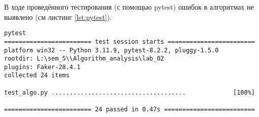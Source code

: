 В ходе проведённого тестирования (с помощью pytest) ошибок в алгоритмах не выявлено (см листинг \ref{lst:pytest}).

\vspace{0.25cm}
\begin{lstlisting}[caption=тестирование алгоритмов с помощью pytest]
pytest
======================== test session starts ========================
platform win32 -- Python 3.11.9, pytest-8.2.2, pluggy-1.5.0
rootdir: L:\sem_5\\Algorithm_analysis\lab_02
plugins: Faker-28.4.1
collected 24 items                                                                                                                                                                

test_algo.py .....................................             [100%]

======================== 24 passed in 0.47s =========================
\end{lstlisting}
\label{lst:pytest}

\newpage